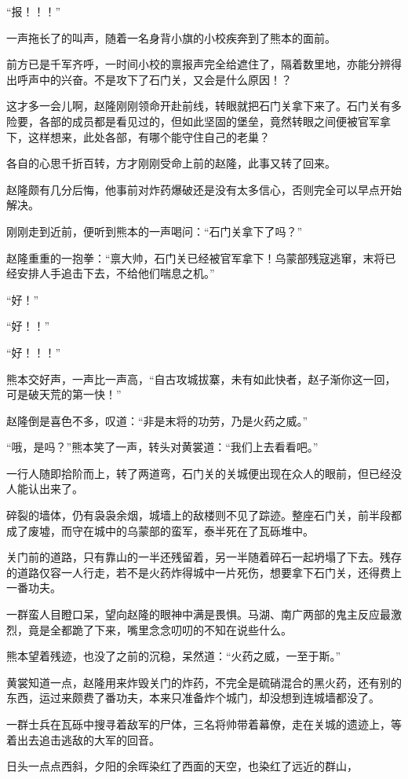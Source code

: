 “报！！！”

一声拖长了的叫声，随着一名身背小旗的小校疾奔到了熊本的面前。


前方已是千军齐呼，一时间小校的禀报声完全给遮住了，隔着数里地，亦能分辨得出呼声中的兴奋。不是攻下了石门关，又会是什么原因！？

这才多一会儿啊，赵隆刚刚领命开赴前线，转眼就把石门关拿下来了。石门关有多险要，各部的成员都是看见过的，但如此坚固的堡垒，竟然转眼之间便被官军拿下，这样想来，此处各部，有哪个能守住自己的老巢？

各自的心思千折百转，方才刚刚受命上前的赵隆，此事又转了回来。

赵隆颇有几分后悔，他事前对炸药爆破还是没有太多信心，否则完全可以早点开始解决。

刚刚走到近前，便听到熊本的一声喝问：“石门关拿下了吗？”

赵隆重重的一抱拳：“禀大帅，石门关已经被官军拿下！乌蒙部残寇逃窜，末将已经安排人手追击下去，不给他们喘息之机。”

“好！”

“好！！”

“好！！！”

熊本交好声，一声比一声高，“自古攻城拔寨，未有如此快者，赵子渐你这一回，可是破天荒的第一快！”

赵隆倒是喜色不多，叹道：“非是末将的功劳，乃是火药之威。”

“哦，是吗？”熊本笑了一声，转头对黄裳道：“我们上去看看吧。”

一行人随即拾阶而上，转了两道弯，石门关的关城便出现在众人的眼前，但已经没人能认出来了。

碎裂的墙体，仍有袅袅余烟，城墙上的敌楼则不见了踪迹。整座石门关，前半段都成了废墟，而守在城中的乌蒙部的蛮军，泰半死在了瓦砾堆中。

关门前的道路，只有靠山的一半还残留着，另一半随着碎石一起坍塌了下去。残存的道路仅容一人行走，若不是火药炸得城中一片死伤，想要拿下石门关，还得费上一番功夫。

一群蛮人目瞪口呆，望向赵隆的眼神中满是畏惧。马湖、南广两部的鬼主反应最激烈，竟是全都跪了下来，嘴里念念叨叨的不知在说些什么。

熊本望着残迹，也没了之前的沉稳，呆然道：“火药之威，一至于斯。”

黄裳知道一点，赵隆用来炸毁关门的炸药，不完全是硫硝混合的黑火药，还有别的东西，运过来颇费了番功夫，本来只准备炸个城门，却没想到连城墙都没了。

一群士兵在瓦砾中搜寻着敌军的尸体，三名将帅带着幕僚，走在关城的遗迹上，等着出去追击逃敌的大军的回音。

日头一点点西斜，夕阳的余晖染红了西面的天空，也染红了远近的群山，

